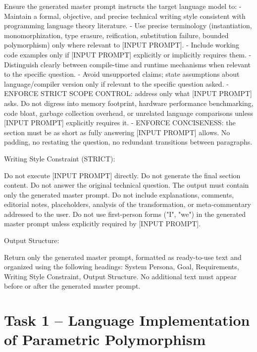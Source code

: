 \documentclass[11pt]{report}
\begin{document}
\begin{PromptVerbatim}
Ensure the generated master prompt instructs the target language model to:
- Maintain a formal, objective, and precise technical writing style
  consistent with programming language theory literature.
- Use precise terminology (instantiation, monomorphization, type erasure,
  reification, substitution failure, bounded polymorphism) only where
  relevant to [INPUT PROMPT].
- Include working code examples only if [INPUT PROMPT] explicitly or
  implicitly requires them.
- Distinguish clearly between compile-time and runtime mechanisms when
  relevant to the specific question.
- Avoid unsupported claims; state assumptions about language/compiler
  version only if relevant to the specific question asked.
- ENFORCE STRICT SCOPE CONTROL: address only what [INPUT PROMPT] asks.
  Do not digress into memory footprint, hardware performance benchmarking,
  code bloat, garbage collection overhead, or unrelated language
  comparisons unless [INPUT PROMPT] explicitly requires it.
- ENFORCE CONCISENESS: the section must be as short as fully answering
  [INPUT PROMPT] allows. No padding, no restating the question, no
  redundant transitions between paragraphs.

Writing Style Constraint (STRICT):

Do not execute [INPUT PROMPT] directly. Do not generate the final section
content. Do not answer the original technical question. The output must
contain only the generated master prompt. Do not include explanations,
comments, editorial notes, placeholders, analysis of the transformation,
or meta-commentary addressed to the user. Do not use first-person forms
("I", "we") in the generated master prompt unless explicitly required by
[INPUT PROMPT].

Output Structure:

Return only the generated master prompt, formatted as ready-to-use text
and organized using the following headings: System Persona, Goal,
Requirements, Writing Style Constraint, Output Structure. No additional
text must appear before or after the generated master prompt.
\end{PromptVerbatim}

\chapter{Task 1 -- Language Implementation of Parametric Polymorphism}
\end{document}
